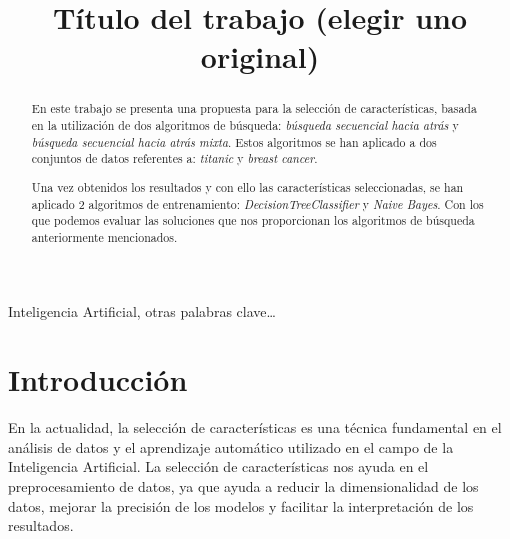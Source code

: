 \documentclass[conference,a4paper]{IEEEtran}
\begin{document}
\title{Título del trabajo (elegir uno original)}

\author{
  
  \and
  
}

\maketitle

\begin{abstract}
  En este trabajo se presenta una propuesta para la selección de características,
  basada en la utilización de dos algoritmos de búsqueda: \emph{búsqueda secuencial hacia atrás} y
  \emph{búsqueda secuencial hacia atrás mixta}. 
  Estos algoritmos se han aplicado a dos conjuntos de datos referentes a: \emph{titanic} y \emph{breast cancer}.

  Una vez obtenidos los resultados y con ello las características seleccionadas, se han aplicado 2 algoritmos de 
  entrenamiento: \emph{DecisionTreeClassifier} y \emph{Naive Bayes}. Con los que podemos evaluar las soluciones
  que nos proporcionan los algoritmos de búsqueda anteriormente mencionados.
\end{abstract}

\begin{IEEEkeywords}
  Inteligencia Artificial, otras palabras clave…
\end{IEEEkeywords}

\section{Introducción}
En la actualidad, la selección de características es una técnica fundamental en el análisis de datos y el aprendizaje automático
utilizado en el campo de la Inteligencia Artificial. La selección de características nos ayuda en el preprocesamiento de
datos, ya que ayuda a reducir la dimensionalidad de los datos, mejorar la precisión de los modelos y facilitar la interpretación
de los resultados.
\end{document}
